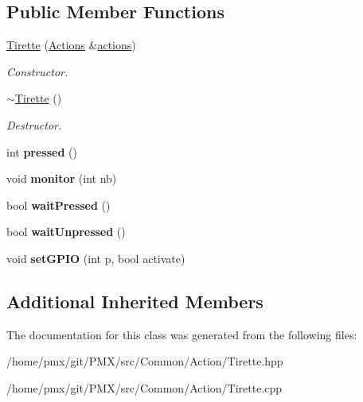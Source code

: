 \subsection*{Public Member Functions}
\begin{DoxyCompactItemize}
\item 
\mbox{\label{classTirette_a0e3159f80f9bdd63062fdc3b327e55f7}} 
\hyperlink{classTirette_a0e3159f80f9bdd63062fdc3b327e55f7}{Tirette} (\hyperlink{classActions}{Actions} \&\hyperlink{classAActionsElement_a3fbd5b8201049a59602d8b7201a9ef8a}{actions})
\begin{DoxyCompactList}\small\item\em Constructor. \end{DoxyCompactList}\item 
\mbox{\label{classTirette_abb879cb3df78e287a988ea8b471b31be}} 
\hyperlink{classTirette_abb879cb3df78e287a988ea8b471b31be}{$\sim$\+Tirette} ()
\begin{DoxyCompactList}\small\item\em Destructor. \end{DoxyCompactList}\item 
\mbox{\label{classTirette_ad8f33a558301b69774f648a5dc3ac925}} 
int {\bfseries pressed} ()
\item 
\mbox{\label{classTirette_afeb2d5ec3cadb1cc76ae203159495408}} 
void {\bfseries monitor} (int nb)
\item 
\mbox{\label{classTirette_aff648839d9bf4cb4d814c0b45b93fc1c}} 
bool {\bfseries wait\+Pressed} ()
\item 
\mbox{\label{classTirette_afbe05aa7c5733bdda2a251b2ca35e14d}} 
bool {\bfseries wait\+Unpressed} ()
\item 
\mbox{\label{classTirette_a218fc478076a6d7952163eeb6a6d07a5}} 
void {\bfseries set\+G\+P\+IO} (int p, bool activate)
\end{DoxyCompactItemize}
\subsection*{Additional Inherited Members}


The documentation for this class was generated from the following files\+:\begin{DoxyCompactItemize}
\item 
/home/pmx/git/\+P\+M\+X/src/\+Common/\+Action/Tirette.\+hpp\item 
/home/pmx/git/\+P\+M\+X/src/\+Common/\+Action/Tirette.\+cpp\end{DoxyCompactItemize}
